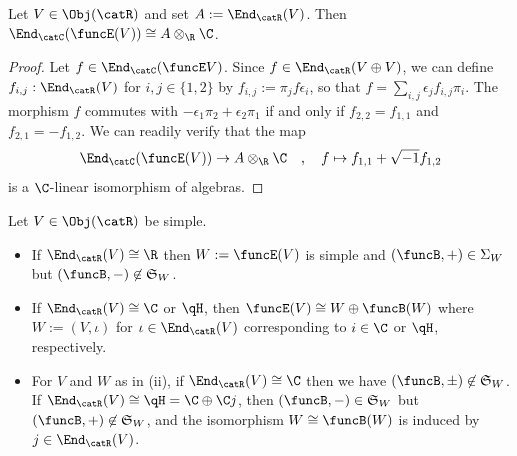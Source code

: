 \documentclass[12pt]{amsart}
\begin{document}
\begin{lem}
\label{lem:Hom(EV,EV)}
Let $V\in\Obj(\catR)$ and set $A:=\End_{\catR}(V)$. Then $\End_{\catC}(\funcE (V))\cong A\otimes_{\R}\C$.
\end{lem}
\begin{proof}
Let $f\in \End_{\catC}(\funcE V)$. Since $f\in\End_{\catR}(V\oplus V)$, we can define $f_{i,j}:\End_{\catR}(V)$ 
for $i,j\in\{1,2\}$
by $f_{i,j}:=\pi_jf\epsilon_i$, so that
$
f=\sum_{i,j}\epsilon_j f_{i,j}\pi_i
$. 
The morphism $f$  commutes with 
$-\epsilon_1\pi_2+\epsilon_2\pi_1$ if and only if  $f_{2,2}=f_{1,1}$ and $f_{2,1}=-f_{1,2}$. We can readily verify that the map
\[
\End_{\catC}(\funcE (V))\to A\otimes_\R\C
\quad,\quad
f\mapsto f_{1,1}+\sqrt{-1}f_{1,2}
\] 
is a $\C$-linear isomorphism of algebras.
\end{proof}


\begin{lem}
\label{lem:EndRCH}
Let $V\in\Obj(\catR)$ be simple. 
\begin{itemize}
\item[\rm (i)]
If $\End_\catR(V)\cong\R$ then $W:=\funcE(V)$ is simple and $(\funcB,+)\in\Sigma_W$ but $(\funcB,-)\not\in\mathfrak S_W$.
\item[\rm (ii)]
If $\End_\catR(V)\cong \C$ or $\qH$, then $\funcE(V)\cong W\oplus \funcB(W)$ where $W:=(V,\iota)$ for $\iota\in\End_\catR(V)$ corresponding to $i\in\C$ or $\qH$, respectively. \item[\rm (iii)] For $V$ and $W$ as in (ii), if
 $\End_\catR(V)\cong \C$  then we have $(\funcB,\pm)\not\in\mathfrak S_W$. If 
  $\End_\catR(V)\cong \qH=\C\oplus \C j$, then 
$(\funcB,-)\in\mathfrak S_W$ but $(\funcB,+)\not\in\mathfrak S_W$, and the isomorphism $W\cong \funcB(W)$ is induced by $j\in\End_\catR(V)$.

\end{itemize}
\end{lem}
\end{document}
